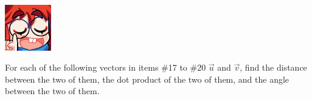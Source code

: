 \documentclass{article}
\begin{document}
\begin{minipage}{.14\textwidth}
    \vspace{0pt}
    \includegraphics[width=2cm]{nerd_maddy.png}
\end{minipage}%
\pagebreak
\begin{center}
    \colorbox{CornflowerBlue!50}{
    \begin{minipage}[c]{0.9\textwidth}
        \centering
        For each of the following vectors in items \#17 to \#20 \(\overrightarrow{u}\) and \(\overrightarrow{v}\), find the distance between the two of them, the dot product of the two of them, and the angle between the two of them. 
    \end{minipage}
    }
\end{center}
\end{document}
